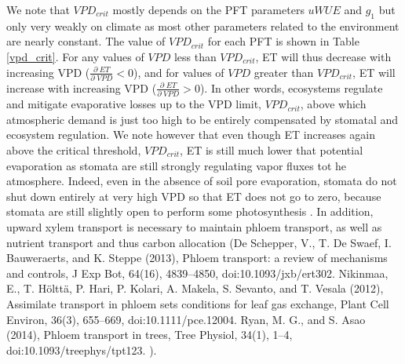 \documentclass[draft,linenumbers]{agujournal}
\begin{document}
We note that $VPD_{crit}$ mostly depends on the PFT parameters $uWUE$ and $g_1$ but only very weakly on climate as most other parameters related to the environment are nearly constant. The value of $VPD_{crit}$ for each PFT is shown in Table \ref{vpd_crit}. For any values of $VPD$ less than $VPD_{crit}$, ET will thus decrease with increasing VPD ($\frac{\partial \; ET}{\partial \; VPD} < 0$), and for values of $VPD$ greater than $VPD_{crit}$, ET will increase with increasing VPD ($\frac{\partial \; ET}{\partial \; VPD} > 0$). In other words, ecosystems regulate and mitigate evaporative losses up to the VPD limit, $VPD_{crit}$, above which atmospheric demand is just too high to be entirely compensated by stomatal and ecosystem regulation. We note however that even though ET increases again above the critical threshold, $VPD_{crit}$, ET is still much lower that potential evaporation as stomata are still strongly regulating vapor fluxes tot he atmosphere. Indeed, even in the absence of soil pore evaporation, stomata do not shut down entirely at very high VPD so that ET does not go to zero, because stomata are still slightly open to perform some photosynthesis \citep{Ball_1987, Leuning_1990, MEDLYN_2011}. In addition, upward xylem transport is necessary to maintain phloem transport, as well as nutrient transport and thus carbon allocation (De Schepper, V., T. De Swaef, I. Bauweraerts, and K. Steppe (2013), Phloem transport: a review of mechanisms and controls, J Exp Bot, 64(16), 4839–4850, doi:10.1093/jxb/ert302.
Nikinmaa, E., T. Hölttä, P. Hari, P. Kolari, A. Makela, S. Sevanto, and T. Vesala (2012), Assimilate transport in phloem sets conditions for leaf gas exchange, Plant Cell Environ, 36(3), 655–669, doi:10.1111/pce.12004.
Ryan, M. G., and S. Asao (2014), Phloem transport in trees, Tree Physiol, 34(1), 1–4, doi:10.1093/treephys/tpt123.
).
\end{document}
